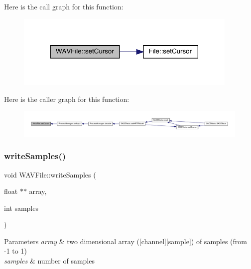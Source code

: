 Here is the call graph for this function\+:
\nopagebreak
\begin{figure}[H]
\begin{center}
\leavevmode
\includegraphics[width=302pt]{class_w_a_v_file_af9ffb0dd3ec2746708dd25546b2e7afd_cgraph}
\end{center}
\end{figure}
Here is the caller graph for this function\+:
\nopagebreak
\begin{figure}[H]
\begin{center}
\leavevmode
\includegraphics[width=350pt]{class_w_a_v_file_af9ffb0dd3ec2746708dd25546b2e7afd_icgraph}
\end{center}
\end{figure}
\mbox{\label{class_w_a_v_file_aa0f1b604b4ff5c00ee84dfd4851ad2f9}} 
\subsubsection{\texorpdfstring{write\+Samples()}{writeSamples()}}
{\footnotesize\ttfamily void W\+A\+V\+File\+::write\+Samples (\begin{DoxyParamCaption}\item[{float $\ast$$\ast$}]{array,  }\item[{int}]{samples }\end{DoxyParamCaption})}


\begin{DoxyParams}{Parameters}
{\em array} & two dimensional array (\mbox{[}channel\mbox{]}\mbox{[}sample\mbox{]}) of samples (from -\/1 to 1) \\
\hline
{\em samples} & number of samples \\
\hline
\end{DoxyParams}


